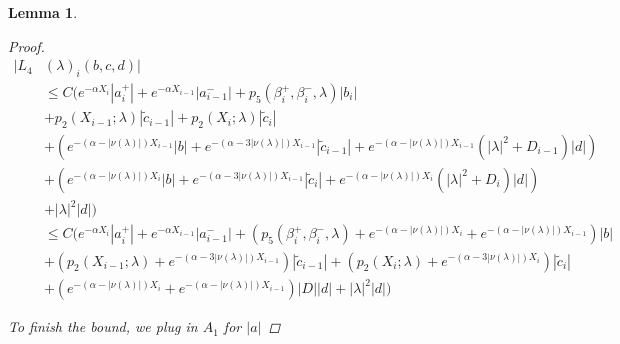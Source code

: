 \documentclass[12pt]{article}
\newtheorem{lemma}{Lemma}
\begin{document}
\begin{lemma}
\begin{proof}
\begin{align*}
|L_4&(\lambda)_i(b, c, d)|\\
&\leq C \Big( e^{-\alpha X_i} |a_i^+| +  e^{-\alpha X_{i-1}} |a_{i-1}^-| + p_5(\beta_i^+, \beta_i^-, \lambda) |b_i| \\
&+ p_2(X_{i-1}; \lambda) |\tilde{c}_{i-1}| + p_2(X_i; \lambda) |\tilde{c}_i| \\
&+ ( e^{-(\alpha - |\nu(\lambda)|) X_{i-1}} |b| + e^{-(\alpha - 3 |\nu(\lambda)|) X_{i-1}}|\tilde{c}_{i-1}| + e^{-(\alpha - |\nu(\lambda)|) X_{i-1}} (|\lambda|^2 + D_{i-1})|d| ) \\
&+ ( e^{-(\alpha - |\nu(\lambda)|) X_i} |b| + e^{-(\alpha - 3 |\nu(\lambda)|) X_{i-1}}|\tilde{c}_i| + e^{-(\alpha - |\nu(\lambda)|) X_i} (|\lambda|^2 + D_i)|d| )  \\
&+ |\lambda|^2 |d| \Big)\\
&\leq C \Big( e^{-\alpha X_i} |a_i^+| +  e^{-\alpha X_{i-1}} |a_{i-1}^-| + (p_5(\beta_i^+, \beta_i^-, \lambda) + e^{-(\alpha - |\nu(\lambda)|) X_i} + e^{-(\alpha - |\nu(\lambda)|) X_{i-1}}) |b| \\
&+ (p_2(X_{i-1}; \lambda) + e^{-(\alpha - 3 |\nu(\lambda)|) X_{i-1}}) |\tilde{c}_{i-1}| + (p_2(X_i; \lambda) + e^{-(\alpha - 3 |\nu(\lambda)|) X_i})|\tilde{c}_i| \\
&+ (e^{-(\alpha - |\nu(\lambda)|) X_i} + e^{-(\alpha - |\nu(\lambda)|) X_{i-1}})|D||d| + |\lambda|^2|d|
\Big)
\end{align*}

To finish the bound, we plug in $A_1$ for $|a|$


\end{proof}
\end{lemma}
\end{document}
